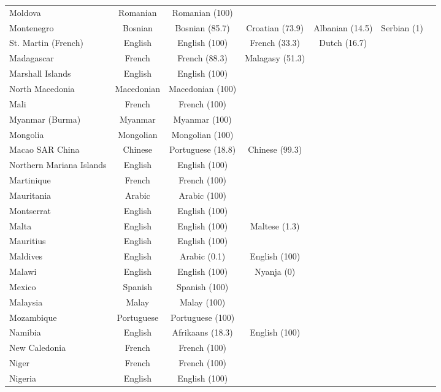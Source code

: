 \begin{longtable}{lc | c | c | c | c | c}
 Moldova & Romanian & Romanian (100) &   &   &   &   \\ 
 Montenegro & Bosnian & Bosnian (85.7) & Croatian (73.9) & Albanian (14.5) & Serbian (1) &   \\ 
 St. Martin (French) & English & English (100) & French (33.3) & Dutch (16.7) &   &   \\ 
 Madagascar & French & French (88.3) & Malagasy (51.3) &   &   &   \\ 
 Marshall Islands & English & English (100) &   &   &   &   \\ 
 North Macedonia & Macedonian & Macedonian (100) &   &   &   &   \\ 
 Mali & French & French (100) &   &   &   &   \\ 
 Myanmar (Burma) & Myanmar & Myanmar (100) &   &   &   &   \\ 
 Mongolia & Mongolian & Mongolian (100) &   &   &   &   \\ 
 Macao SAR China & Chinese & Portuguese (18.8) & Chinese (99.3) &   &   &   \\ 
 Northern Mariana Islands & English & English (100) &   &   &   &   \\ 
 Martinique & French & French (100) &   &   &   &   \\ 
 Mauritania & Arabic & Arabic (100) &   &   &   &   \\ 
 Montserrat & English & English (100) &   &   &   &   \\ 
 Malta & English & English (100) & Maltese (1.3) &   &   &   \\ 
 Mauritius & English & English (100) &   &   &   &   \\ 
 Maldives & English & Arabic (0.1) & English (100) &   &   &   \\ 
 Malawi & English & English (100) & Nyanja (0) &   &   &   \\ 
 Mexico & Spanish & Spanish (100) &   &   &   &   \\ 
 Malaysia & Malay & Malay (100) &   &   &   &   \\ 
 Mozambique & Portuguese & Portuguese (100) &   &   &   &   \\ 
 Namibia & English & Afrikaans (18.3) & English (100) &   &   &   \\ 
 New Caledonia & French & French (100) &   &   &   &   \\ 
 Niger & French & French (100) &   &   &   &   \\ 
 Nigeria & English & English (100) &   &   &   &   \\ 

\end{longtable}
